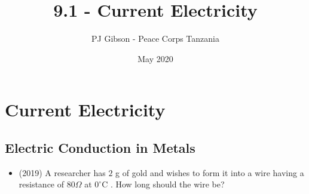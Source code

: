 \documentclass{article}
\title{9.1 - Current Electricity}
\author{PJ Gibson - Peace Corps Tanzania}
\date{May 2020}
\begin{document}
\maketitle


\section{Current Electricity}

\subsection{Electric Conduction in Metals}
\begin{itemize}
\item (2019)  A researcher has $ 2$ g of gold and wishes to form it into a wire having a resistance of $ 80\Omega $ at $ 0^{\circ}$C . How long should the wire be? 
\end{itemize}
\end{document}

